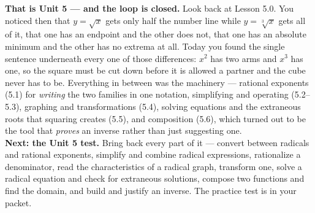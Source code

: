 \documentclass[10pt]{article}
\begin{document}
\begin{extensionbox}
\end{extensionbox}

\begin{spiralbox}
\textbf{That is Unit 5 --- and the loop is closed.} Look back at Lesson 5.0. You noticed then that
$y=\sqrt{x}$ gets only half the number line while $y=\sqrt[3]{x}$ gets all of it, that one has an
endpoint and the other does not, that one has an absolute minimum and the other has no extrema at
all. Today you found the single sentence underneath every one of those differences: $x^{2}$ has two
arms and $x^{3}$ has one, so the square must be cut down before it is allowed a partner and the cube
never has to be. Everything in between was the machinery --- rational exponents (5.1) for
\emph{writing} the two families in one notation, simplifying and operating (5.2--5.3), graphing and
transformations (5.4), solving equations and the extraneous roots that squaring creates (5.5), and
composition (5.6), which turned out to be the tool that \emph{proves} an inverse rather than just
suggesting one.
\\[4pt]
\textbf{Next: the Unit 5 test.} Bring back every part of it --- convert between radicals and rational
exponents, simplify and combine radical expressions, rationalize a denominator, read the
characteristics of a radical graph, transform one, solve a radical equation and check for
extraneous solutions, compose two functions and find the domain, and build and justify an inverse.
The practice test is in your packet.
\end{spiralbox}
\end{document}
